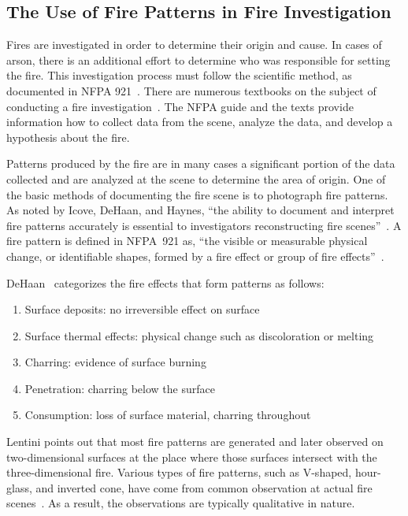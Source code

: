\documentclass[twoside]{uocthesis}
\begin{document}
\subsection{The Use of Fire Patterns in Fire Investigation}
Fires are investigated in order to determine their origin and cause.  In cases of arson, there is an additional effort to determine who was responsible for setting the fire.  This investigation process must follow the scientific method, as documented in NFPA 921~\cite{NFPA:921}.  There are numerous textbooks on the subject of conducting a fire investigation~\cite{Almirall:2004,Fire_Investigation,DeHaan:2012,Icove:2013,Lentini:2006,Noon:1995}. The NFPA guide and the texts provide information how to collect data from the scene, analyze the data, and develop a hypothesis about the fire.

Patterns produced by the fire are in many cases a significant portion of the data collected and are analyzed at the scene to determine the area of origin.  One of the basic methods of documenting the fire scene is to photograph fire patterns.  As noted by Icove, DeHaan, and Haynes,  ``the ability to document and interpret fire patterns accurately is essential to investigators reconstructing fire scenes''~\cite{Icove:2013}.  A fire pattern is defined in NFPA~921 as, ``the visible or measurable physical change, or identifiable shapes, formed by a fire effect or group of fire effects''~\cite{NFPA:921}.

DeHaan~\cite{DeHaan:2012} categorizes the fire effects that form patterns as follows:
\begin{enumerate}
\item Surface deposits: no irreversible effect on surface
\item Surface thermal effects: physical change such as discoloration or melting
\item Charring: evidence of surface burning
\item Penetration: charring below the surface
\item Consumption: loss of surface material, charring throughout
\end{enumerate}

Lentini points out that most fire patterns are generated and later observed on two-dimensional surfaces at the place where those surfaces intersect with the three-dimensional fire. Various types of fire patterns, such as V-shaped, hour-glass, and inverted cone, have come from common observation at actual fire scenes~\cite{Lentini:2006}.  As a result, the observations are typically qualitative in nature.
\end{document}
